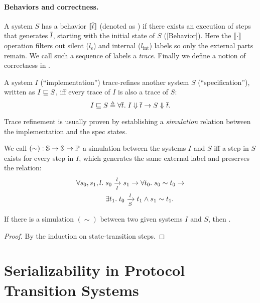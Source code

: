 \documentclass[sigplan,10pt,review,anonymous,screen]{acmart}\settopmatter{printfolios=true,printccs=false,printacmref=false}
\begin{document}
\paragraph{Behaviors and correctness.}
A system $S$ has a behavior $\behOf{\listof{l}}$ (denoted as ) if there exists an execution of steps that generates $\listof{l}$, starting with the initial state of $S$ ([Behavior]).
Here the $\behOf{\cdot}$ operation filters out silent ($l_\epsilon$) and internal ($l_{\textrm{int}}$) labels so only the external parts remain.
We call such a sequence of labels a \emph{trace}.
Finally we define a notion of correctness in \hemiola{}.
\begin{definition}
  A system $I$ (``implementation'') trace-refines another system $S$ (``specification''), written as $\refines{I}{S}$, iff every trace of $I$ is also a trace of $S$:
  \begin{displaymath}
    \refines{I}{S} \triangleq \forall \listof{t}.\; \sembeh{I}{\listof{t}} \to \sembeh{S}{\listof{t}}.
  \end{displaymath}
\end{definition}

Trace refinement is usually proven by establishing a \emph{simulation} relation between the implementation and the spec states.
\begin{definition}[Simulation]
  We call $(\sim): \hstt{} \to \hstt{} \to \propt{}$ a simulation between the systems $I$ and $S$ iff a step in $S$ exists for every step in $I$, which generates the same external label and preserves the relation:
  \begin{align*}
    \forall s_0, s_1, l.\; & \semstep{I}{s_0}{l}{s_1} \to \forall t_0.\; s_0 \sim t_0 \to\\
    & \exists t_1.\; \semstep{S}{t_0}{l}{t_1} \wedge s_1 \sim t_1.
  \end{align*}
\end{definition}
\begin{theorem}
  If there is a simulation $(\sim)$ between two given systems $I$ and $S$, then .
\end{theorem}
\begin{proof}
  By the induction on state-transition steps.
\end{proof}

\section{Serializability in Protocol Transition Systems}
\label{sec-sz-in-hemiola}
\end{document}
